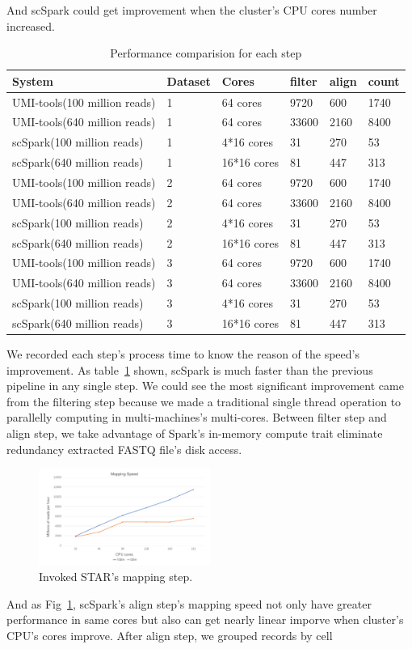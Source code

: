 \documentclass[10pt,journal,compsoc]{IEEEtran}
\begin{document}
And scSpark could get improvement when the cluster's CPU cores number increased.
\begin{table}
	\centering
	\caption{Performance comparision for each step}\label{tab2}
	\resizebox{0.45\textwidth}{!} {
	\begin{tabular}{l | l | l | l | l | l}
		\hline
		System & Dataset & Cores & filter & align & count \\
		\hline
		UMI-tools(100 million reads) & 1 & 64 cores & 9720 & 600 & 1740 \\
		UMI-tools(640 million reads) & 1 & 64 cores & 33600 & 2160 & 8400 \\
		scSpark(100 million reads) & 1 & 4*16 cores & 31 & 270 & 53 \\
		scSpark(640 million reads) & 1 & 16*16 cores & 81 & 447 & 313 \\
		UMI-tools(100 million reads) & 2 & 64 cores & 9720 & 600 & 1740 \\
		UMI-tools(640 million reads) & 2 & 64 cores & 33600 & 2160 & 8400 \\
		scSpark(100 million reads) & 2 & 4*16 cores & 31 & 270 & 53 \\
		scSpark(640 million reads) & 2 & 16*16 cores & 81 & 447 & 313 \\
		UMI-tools(100 million reads) & 3 & 64 cores & 9720 & 600 & 1740 \\
		UMI-tools(640 million reads) & 3 & 64 cores & 33600 & 2160 & 8400 \\
		scSpark(100 million reads) & 3 & 4*16 cores & 31 & 270 & 53 \\
		scSpark(640 million reads) & 3 & 16*16 cores & 81 & 447 & 313 \\
		\hline
	\end{tabular} }
\end{table}
We recorded each step's process time to know the reason of the speed's improvement.
As table~\ref{tab2} shown, scSpark is much faster than the previous pipeline in any single step.
We could see the most significant improvement came from the filtering step because we made a traditional single thread operation to parallelly computing in multi-machines's multi-cores.
Between filter step and align step, we take advantage of Spark's in-memory compute trait eliminate redundancy extracted FASTQ file's disk access.
\begin{figure}
	\includegraphics[width=0.5\textwidth]{fig6.pdf}
	\caption{Invoked STAR's mapping step.} \label{fig6}
\end{figure}
And as Fig~\ref{fig6}, scSpark's align step's mapping speed not only have greater performance in same cores but also can get nearly linear imporve when cluster's CPU's cores improve.
After align step, we grouped records by cell 
\end{document}
